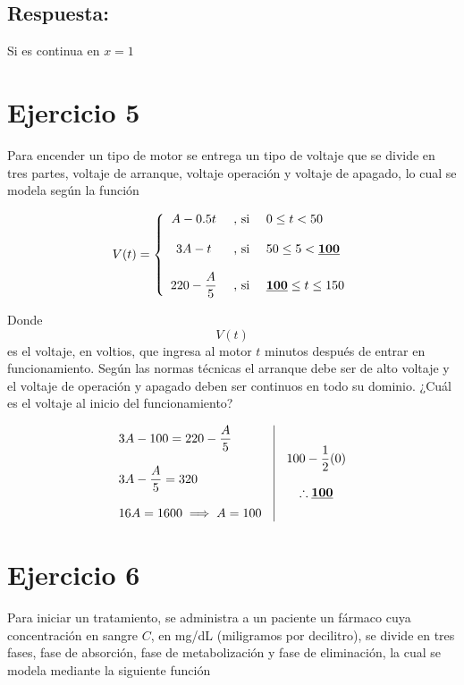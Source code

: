 \documentclass[12pt]{article}
\begin{document}
\subsection*{Respuesta:} \noindent Si es continua en $x=1$




\section*{Ejercicio 5}
\noindent Para encender un tipo de motor se entrega un tipo de voltaje que se divide en tres partes, 
voltaje de arranque, voltaje operación y voltaje de apagado, lo cual se modela según la función

\[
V(t) = 
\left\{
  \begin{array}{c l l}
    A - 0.5t & \text{ , si } & 0 \leq t < 50 \\\\
    3A - t & \text{ , si } & 50 \leq 5 < \textbf{\underline{100}} \\\\
    220 - \dfrac{A}{5} & \text{ , si } & \textbf{\underline{100}} \leq t \leq 150
  \end{array}
\right.
\]

\noindent Donde $$V(t)$$ es el voltaje, en voltios, que ingresa al motor $t$ minutos después de entrar en
funcionamiento. Según las normas técnicas el arranque debe ser de alto voltaje y el voltaje de operación 
y apagado deben ser continuos en todo su dominio. ¿Cuál es el voltaje al inicio del funcionamiento?

\[
\begin{array}{l|c}
  \begin{array}{l}
    3A - 100 = 220 - \dfrac{A}{5} \\\\
    3A - \dfrac{A}{5} = 320 \\\\
    16A = 1600 \implies A = 100
  \end{array}
  &
  \begin{array}{c}
    100 - \dfrac{1}{2}(0) \\\\
    \therefore \textbf{\underline{100}}
  \end{array}
\end{array}
\]




\section*{Ejercicio 6}
\noindent Para iniciar un tratamiento, se administra a un paciente un fármaco cuya concentración en sangre $C$,
en mg/dL (miligramos por decilitro), se divide en tres fases, fase de absorción, fase de metabolización y fase 
de eliminación, la cual se modela mediante la siguiente función
\end{document}
